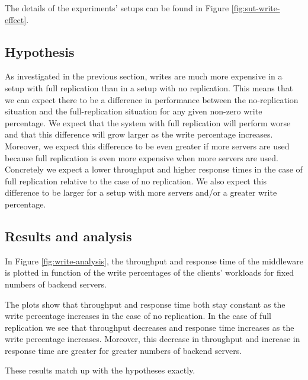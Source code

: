 \documentclass[11pt]{article}
\begin{document}
The details of the experiments' setups can be found in Figure \ref{fig:sut-write-effect}.


\subsection{Hypothesis}


As investigated in the previous section, writes are much more expensive in a setup with full replication than in a setup with no replication.
This means that we can expect there to be a difference in performance between the no-replication situation and the full-replication situation for any given non-zero write percentage.
We expect that the system with full replication will perform worse and that this difference will grow larger as the write percentage increases.
Moreover, we expect this difference to be even greater if more servers are used because full replication is even more expensive when more servers are used.
Concretely we expect a lower throughput and higher response times in the case of full replication relative to the case of no replication.
We also expect this difference to be larger for a setup with more servers and/or a greater write percentage.


\subsection{Results and analysis}

In Figure \ref{fig:write-analysis}, the throughput and response time of the middleware is plotted in function of the write percentages of the clients' workloads for fixed numbers of backend servers.

The plots show that throughput and response time both stay constant as the write percentage increases in the case of no replication.
In the case of full replication we see that throughput decreases and response time increases as the write percentage increases.
Moreover, this decrease in throughput and increase in response time are greater for greater numbers of backend servers.

These results match up with the hypotheses exactly.
\end{document}
